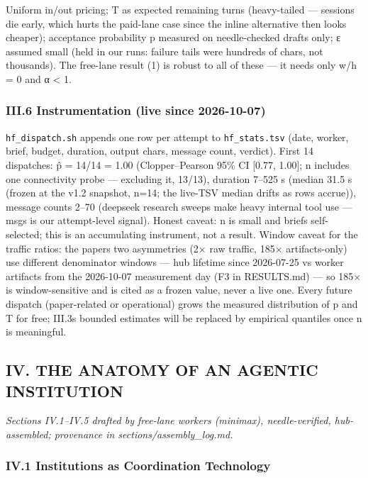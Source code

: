 \documentclass[
]{article}
\begin{document}
Uniform in/out pricing; T as expected remaining turns (heavy-tailed ---
sessions die early, which hurts the paid-lane case since the inline
alternative then looks cheaper); acceptance probability p measured on
needle-checked drafts only; ε assumed small (held in our runs: failure
tails were hundreds of chars, not thousands). The free-lane result (1)
is robust to all of these --- it needs only w/h = 0 and α \textless{} 1.

\subsubsection{III.6 Instrumentation (live since
2026-10-07)}\label{iii6-instrumentation-live-since-2026-10-07}

\texttt{hf\_dispatch.sh} appends one row per attempt to
\texttt{hf\_stats.tsv} (date, worker, brief, budget, duration, output
chars, message count, verdict). First 14 dispatches: p̂ = 14/14 = 1.00
(Clopper--Pearson 95\% CI {[}0.77, 1.00{]}; n includes one connectivity
probe --- excluding it, 13/13), duration 7--525 s (median 31.5 s (frozen
at the v1.2 snapshot, n=14; the live-TSV median drifts as rows accrue)),
message counts 2--70 (deepseek research sweeps make heavy internal tool
use --- msgs is our attempt-level signal). Honest caveat: n is small and
briefs self-selected; this is an accumulating instrument, not a result.
Window caveat for the traffic ratios: the paper\textquotesingle s two
asymmetries (2× raw traffic, 185× artifacts-only) use different
denominator windows --- hub lifetime since 2026-07-25 vs worker
artifacts from the 2026-10-07 measurement day (F3 in RESULTS.md) --- so
185× is window-sensitive and is cited as a frozen value, never a live
one. Every future dispatch (paper-related or operational) grows the
measured distribution of p and T for free; III.3\textquotesingle s
bounded estimates will be replaced by empirical quantiles once n is
meaningful.

\subsection{IV. THE ANATOMY OF AN AGENTIC
INSTITUTION}\label{iv-the-anatomy-of-an-agentic-institution}

\emph{Sections IV.1--IV.5 drafted by free-lane workers (minimax),
needle-verified, hub-assembled; provenance in
sections/assembly\_log.md.}

\subsubsection{IV.1 Institutions as Coordination
Technology}\label{iv1-institutions-as-coordination-technology}
\end{document}
